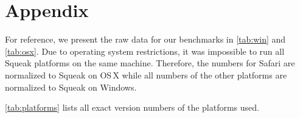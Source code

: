 \documentclass[natbib]{sigplanconf}
\begin{document}
\section*{Appendix}
\label{sec:appendix}
\begingroup
\renewcommand*\thetable{\Alph{table}}
\setcounter{table}{0}
\itshape

For reference, we present the raw data for our benchmarks in
\autoref{tab:win} and \autoref{tab:osx}. Due to operating system
restrictions, it was impossible to run all Squeak platforms on the
same machine. Therefore, the numbers for Safari are normalized to
Squeak on OS\,X while all numbers of the other platforms are
normalized to Squeak on Windows.

\autoref{tab:platforms} lists all exact version numbers of the
platforms used.

\begin{table}[h]
  \centering
  
  \caption{Exact platform versions}
  \label{tab:platforms}
\end{table}
\begin{table}[h]
 \centering
  \\
  
  \caption{Benchmarks and speeds, raw numbers (run on OS\,X on Intel Core
    i7-4850HQ CPU @ 2.30 GHz) }
  \label{tab:osx}
\end{table}

\begin{table}
  \centering
  \\
  
  \caption{Benchmarks and speeds, raw numbers (run on Windows on Intel
    Core i5-4300U CPU @ 2.80 GHz). Note that Potato could not run the
    \textbf{draw} benchmark due to its incomplete BitBlt
    implementation, and that the \textbf{fill} and \textbf{richards}
    benchmarks, both of which put much pressure on the GC, perform
    very badly on Potato.}
  \label{tab:win}
\end{table}


\endgroup
\end{document}
